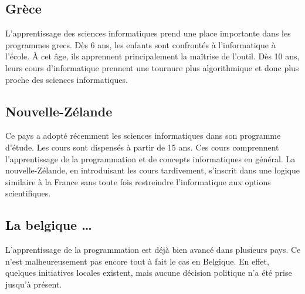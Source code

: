 \subsection{Grèce}
L'apprentissage des sciences informatiques prend une place importante dans les programmes grecs. Dès 6 ans, les enfants sont confrontés à l'informatique à l'école. À cet âge, ils apprennent principalement la maîtrise de l'outil. Dès 10 ans, leurs cours d'informatique prennent une tournure plus algorithmique et donc plus proche des sciences informatiques.

\subsection{Nouvelle-Zélande}
Ce pays a adopté récemment les sciences informatiques dans son programme d'étude. Les cours sont dispensés à partir de 15 ans. Ces cours comprennent l'apprentissage de la programmation et de concepts informatiques en général. La nouvelle-Zélande, en introduisant les cours tardivement, s'inscrit dans une logique similaire à la France sans toute fois restreindre l'informatique aux options scientifiques.

\subsection{La belgique \ldots}
L'apprentissage de la programmation est déjà bien avancé dans plusieurs pays. Ce n'est malheureusement pas encore tout à fait le cas en Belgique. En effet, quelques initiatives locales existent, mais aucune décision politique n'a été prise jusqu'à présent.

